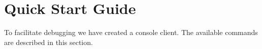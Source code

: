 \documentclass[a4paper,12pt]{article}
\begin{document}

%
%
%
%
%
%
%
%
%
%
%




\setcounter{section}{4}

\section{Quick Start Guide}
To facilitate debugging we have created a console client. The available commands are described in this section.
\end{document}
